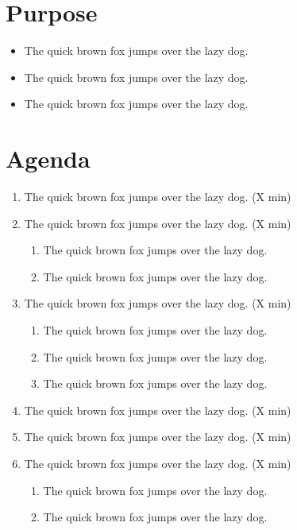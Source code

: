 \documentclass[12pt]{article}
\begin{document}

\section*{Purpose}
\begin{itemize}
    \item The quick brown fox jumps over the lazy dog.
    \item The quick brown fox jumps over the lazy dog.
    \item The quick brown fox jumps over the lazy dog.
\end{itemize}

\section*{Agenda}
\begin{enumerate}
    \item The quick brown fox jumps over the lazy dog. (X min)
    \item The quick brown fox jumps over the lazy dog. (X min)
    \begin{enumerate}
        \item The quick brown fox jumps over the lazy dog.
        \item The quick brown fox jumps over the lazy dog.
    \end{enumerate}
    \item The quick brown fox jumps over the lazy dog. (X min)
    \begin{enumerate}
        \item The quick brown fox jumps over the lazy dog.
        \item The quick brown fox jumps over the lazy dog.
        \item The quick brown fox jumps over the lazy dog.
    \end{enumerate}
    \item The quick brown fox jumps over the lazy dog. (X min)
    \item The quick brown fox jumps over the lazy dog. (X min)
    \item The quick brown fox jumps over the lazy dog. (X min)
    \begin{enumerate}
        \item The quick brown fox jumps over the lazy dog.
        \item The quick brown fox jumps over the lazy dog.
    \end{enumerate}
\end{enumerate}
\end{document}
